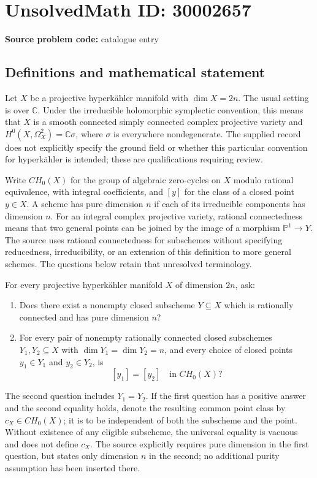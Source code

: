 \documentclass[11pt]{article}
\newcommand{\C}{\mathbb{C}}
\newcommand{\PP}{\mathbb{P}}
\begin{document}
\section*{UnsolvedMath ID: 30002657}
\textbf{Source problem code:} catalogue entry
\subsection{Definitions and mathematical statement}
Let \(X\) be a projective hyperkähler manifold with \(\dim X=2n\). The usual setting is over \(\C\). Under the irreducible holomorphic symplectic convention, this means that \(X\) is a smooth connected simply connected complex projective variety and \(H^0(X,\Omega_X^2)=\C\sigma\), where \(\sigma\) is everywhere nondegenerate. The supplied record does not explicitly specify the ground field or whether this particular convention for hyperkähler is intended; these are qualifications requiring review.

Write \(CH_0(X)\) for the group of algebraic zero-cycles on \(X\) modulo rational equivalence, with integral coefficients, and \([y]\) for the class of a closed point \(y\in X\). A scheme has pure dimension \(n\) if each of its irreducible components has dimension \(n\). For an integral complex projective variety, rational connectedness means that two general points can be joined by the image of a morphism \(\PP^1\to Y\). The source uses rational connectedness for subschemes without specifying reducedness, irreducibility, or an extension of this definition to more general schemes. The questions below retain that unresolved terminology.

For every projective hyperkähler manifold \(X\) of dimension \(2n\), ask:
\begin{enumerate}
\item Does there exist a nonempty closed subscheme \(Y\subseteq X\) which is rationally connected and has pure dimension \(n\)?
\item For every pair of nonempty rationally connected closed subschemes \(Y_1,Y_2\subseteq X\) with \(\dim Y_1=\dim Y_2=n\), and every choice of closed points \(y_1\in Y_1\) and \(y_2\in Y_2\), is
\[
[y_1]=[y_2]\quad\text{in }CH_0(X)?
\]
\end{enumerate}
The second question includes \(Y_1=Y_2\). If the first question has a positive answer and the second equality holds, denote the resulting common point class by \(c_X\in CH_0(X)\); it is to be independent of both the subscheme and the point. Without existence of any eligible subscheme, the universal equality is vacuous and does not define \(c_X\). The source explicitly requires pure dimension in the first question, but states only dimension \(n\) in the second; no additional purity assumption has been inserted there.
\end{document}
